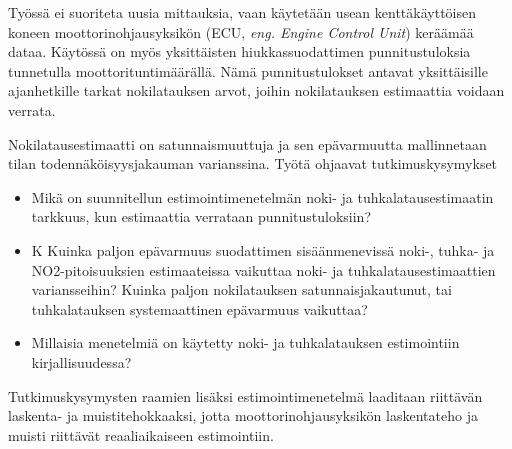 Työssä ei suoriteta uusia mittauksia, vaan käytetään usean kenttäkäyttöisen koneen moottorinohjausyksikön (ECU, \emph{eng. Engine Control Unit}) keräämää dataa. Käytössä on myös yksittäisten hiukkassuodattimen punnitustuloksia tunnetulla moottorituntimäärällä. Nämä punnitustulokset antavat yksittäisille ajanhetkille tarkat nokilatauksen arvot, joihin nokilatauksen estimaattia voidaan verrata.

Nokilatausestimaatti on satunnaismuuttuja ja sen epävarmuutta mallinnetaan tilan todennäköisyysjakauman varianssina. Työtä ohjaavat tutkimuskysymykset
\begin{itemize}

    
    \item Mikä on suunnitellun estimointimenetelmän noki- ja tuhkalatausestimaatin tarkkuus, kun estimaattia verrataan punnitustuloksiin? %

    \item K%
    Kuinka paljon epävarmuus suodattimen sisäänmenevissä noki-, tuhka- ja NO2-pitoisuuksien estimaateissa vaikuttaa noki- ja tuhkalatausestimaattien variansseihin? Kuinka paljon nokilatauksen satunnaisjakautunut, tai tuhkalatauksen systemaattinen epävarmuus vaikuttaa?
    
    \item Millaisia menetelmiä on käytetty noki- ja tuhkalatauksen estimointiin kirjallisuudessa? %
    

\end{itemize}
Tutkimuskysymysten raamien lisäksi estimointimenetelmä laaditaan riittävän laskenta- ja muistitehokkaaksi, jotta moottorinohjausyksikön laskentateho ja muisti riittävät reaaliaikaiseen estimointiin.


